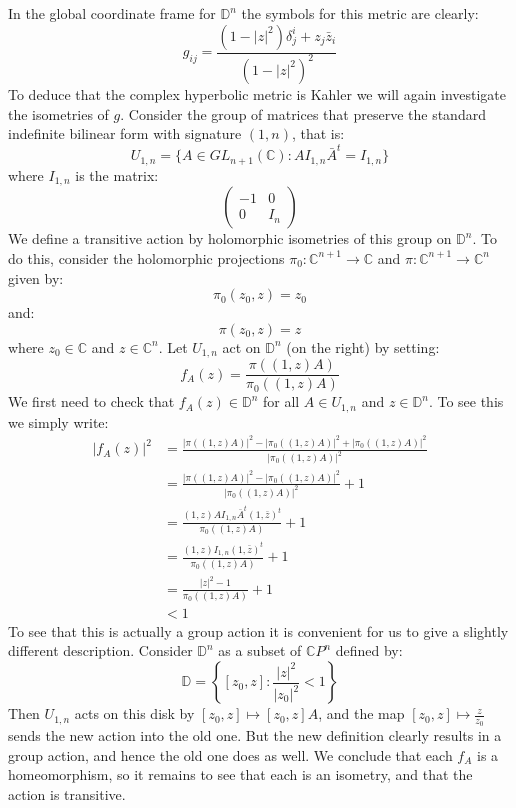 \documentclass[11pt]{amsart}
\theoremstyle{definition}
\def \CP{ \mathbb{C}P }
\def \C{ \mathbb{C} }
\def \disk{ \mathbb{D} }
\begin{document}
In the global coordinate frame for $\disk^n$ the symbols for this metric are clearly:
%
$$ g_{ij} = \frac{ (1 - |z|^2) \delta^i_j + z_j \bar{z}_i }{ (1 - |z|^2)^2 } $$
%
To deduce that the complex hyperbolic metric is Kahler we will again investigate the isometries of $g$.  Consider the group of matrices that preserve the standard indefinite bilinear form with signature $(1,n)$, that is:
%
$$ U_{1,n} = \{ A \in GL_{n+1}( \C ) : A I_{1,n} \bar{A}^{t} = I_{1,n} \} $$
%
where $I_{1,n}$ is the matrix:
%
$$ \left( \begin{array}{cc} -1 & 0 \\ 0 & I_n \end{array} \right) $$
%
We define a transitive action by holomorphic isometries of this group on $\disk^n$.  To do this, consider the holomorphic projections $\pi_0 : \C^{n+1} \rightarrow \C $ and $ \pi : \C^{n+1} \rightarrow \C^{n} $ given by:
%
$$ \pi_0 ( z_0, z ) = z_0 $$
%
and:
%
$$ \pi ( z_0, z ) = z $$
%
where $z_0 \in \C$ and $z \in \C^n$. Let $U_{1,n}$ act on $\disk^n$ (on the right) by setting:
%
$$ f_A (z) = \frac{ \pi( (1,z)A ) }{ \pi_0 ( (1,z)A ) } $$
%
We first need to check that $f_A (z) \in \disk^n$ for all $A \in U_{1,n}$ and $z \in \disk^n$.  To see this we simply write:
%
\begin{align*}
|f_A (z)|^2 &= \frac{ |\pi( (1,z)A )|^2 - |\pi_0 ( (1,z)A )|^2 + |\pi_0 ( (1,z)A )|^2 }{ |\pi_0 ( (1,z)A )|^2 } \\
&= \frac{ |\pi( (1,z)A )|^2 - |\pi_0 ( (1,z)A )|^2 }{ |\pi_0 ( (1,z)A )|^2 } + 1 \\
&= \frac{ (1,z)A I_{1,n} \bar{A}^{t} (1, \bar{z})^{t} }{ \pi_0 ( (1,z)A ) } + 1 \\
&= \frac{ (1,z) I_{1,n} (1, \bar{z} )^{t} }{ \pi_0 ( (1,z)A ) } + 1\\
&= \frac{ |z|^2 - 1  }{ \pi_0 ( (1,z)A ) } + 1 \\
&< 1
\end{align*}
%
To see that this is actually a group action it is convenient for us to give a slightly different description.  Consider $\disk^n$ as a subset of $\CP^n$ defined by:
%
$$ \disk = \left\{ [z_0, z] : \frac{ |z|^2 }{ |z_0|^2 } < 1 \right\} $$
%
Then $U_{1,n}$ acts on this disk by $[z_0, z] \mapsto [z_0, z]A$, and the map $[z_0, z] \mapsto \frac{z}{z_0}$ sends the new action into the old one.  But the new definition clearly results in a group action, and hence the old one does as well.  We conclude that each $f_A$ is a homeomorphism, so it remains to see that each is an isometry, and that the action is transitive.
\end{document}
